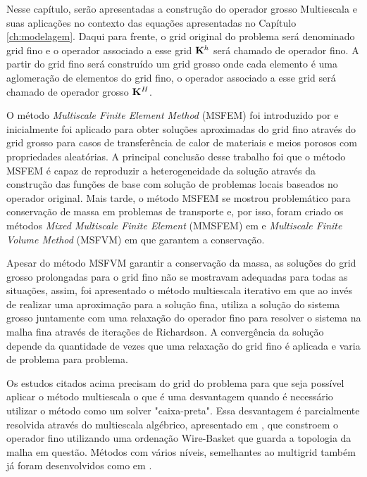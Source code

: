 
Nesse capítulo, serão apresentadas a construção do operador grosso Multiescala e suas aplicações no contexto das equações apresentadas no Capítulo \ref{ch:modelagem}. Daqui para frente, o grid original do problema será denominado grid fino e o operador associado a esse grid $\mathbf{K}^h$ será chamado de operador fino. A partir do grid fino será construído um grid grosso onde cada elemento é uma aglomeração de elementos do grid fino, o operador associado a esse grid será chamado de operador grosso $\mathbf{K}^H$.


O método \textit{Multiscale Finite Element Method} (MSFEM) foi introduzido por \citet{thomashou} e inicialmente foi aplicado para obter soluções aproximadas do grid fino através do grid grosso para casos de transferência de calor de materiais e meios porosos com propriedades aleatórias. A principal conclusão desse trabalho foi que o método MSFEM é capaz de reproduzir a heterogeneidade da solução através da construção das funções de base com solução de problemas locais baseados no operador original. Mais tarde, o método MSFEM se mostrou problemático para conservação de massa em problemas de transporte e, por isso, foram criado os métodos \textit{Mixed Multiscale Finite Element} (MMSFEM) em \citet{mixedmsfem} e  \textit{Multiscale Finite Volume Method} (MSFVM) em \citet{msfv} que garantem a conservação.


Apesar do método MSFVM garantir a conservação da massa, as soluções do grid grosso prolongadas para o grid fino não se mostravam adequadas para todas as situações, assim, foi apresentado o método multiescala iterativo em \citet{iterativems} que ao invés de realizar uma aproximação para a solução fina, utiliza a solução do sistema grosso juntamente com uma relaxação do operador fino para resolver o sistema na malha fina através de iterações de Richardson. A convergência da solução depende da quantidade de vezes que uma relaxação do grid fino é aplicada e varia de problema para problema.


Os estudos citados acima precisam do grid do problema para que seja possível aplicar o método multiescala o que é uma desvantagem quando é necessário utilizar o método como um solver "caixa-preta". Essa desvantagem é parcialmente resolvida através do multiescala algébrico, apresentado em \citet{msalgebrico}, que constroem o operador fino utilizando uma ordenação Wire-Basket que guarda a topologia da malha em questão. Métodos com vários níveis, semelhantes ao multigrid também já foram desenvolvidos como em \citet{multilevel}. 

